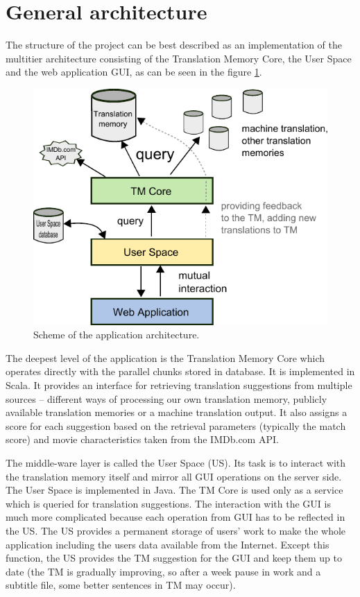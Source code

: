 \section{General architecture}
The structure of the project can be best described as an implementation of the multitier architecture consisting of the Translation Memory Core, the User Space and the web application GUI, as can be seen in the figure \ref{projectStructure:layers}.

\begin{figure}[h]
\begin{center}
\includegraphics{figures/scheme.pdf}
\end{center}
\caption{Scheme of the application architecture.}\label{projectStructure:layers}
\end{figure}

The deepest level of the application is the Translation Memory Core which operates directly with the parallel chunks stored in database. It is implemented in Scala. It provides an interface for retrieving translation suggestions from multiple sources -- different ways of processing our own translation memory, publicly available translation memories or a machine translation output. It also assigns a score for each suggestion based on the retrieval parameters (typically the match score) and movie characteristics taken from the IMDb.com API.

The middle-ware layer is called the User Space (US). Its task is to interact with the translation memory itself and mirror all GUI operations on the server side. The User Space is implemented in Java. The TM Core is used only as a service which is queried for translation suggestions. The interaction with the GUI is much more complicated because each operation from GUI has to be reflected in the US. The US provides a permanent storage of users' work to make the whole application including the users data available from the Internet. Except this function, the US provides the TM suggestion for the GUI and keep them up to date (the TM is gradually improving, so after a week pause in work and a subtitle file, some better sentences in TM may occur).


